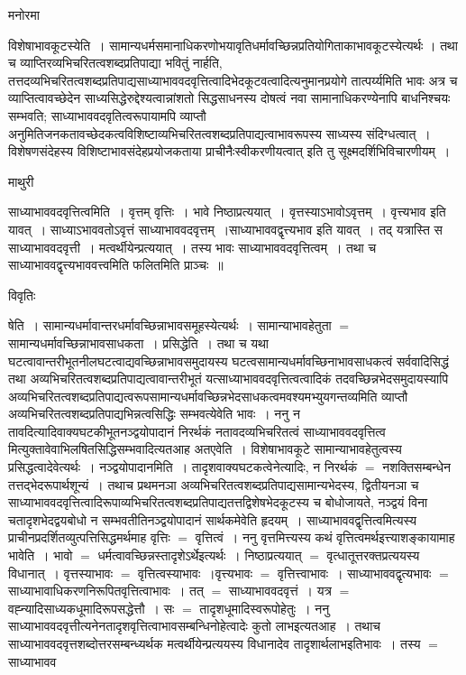 \documentclass[10pt, openany]{book}
\begin{document}
{\begin{center}   मनोरमा  \end{center}

विशेषाभावकूटस्येति~। सामान्यधर्मसमानाधिकरणोभयावृतिधर्मावच्छिन्नप्रतियोगिताकाभावकूटस्येत्यर्थः । तथा च व्याप्तिरव्यभिचरितत्वशब्दप्रतिपाद्या भवितुं नार्हति, तत्तदव्यभिचरितत्वशब्दप्रतिपाद्यसाध्याभाववदवृत्तित्वादिभेदकूटवत्वादित्यनुमानप्रयोगे तात्पर्य्यमिति भावः अत्र च व्याप्तित्वावच्छेदेन साध्यसिद्धेरुद्देश्यत्वान्नांशतो
सिद्धसाधनस्य दोषत्वं नवा सामानाधिकरण्येनापि बाधनिश्चयः सम्भवति; साध्याभाववदवृतित्वरूपायामपि व्याप्तौ अनुमितिजनकतावच्छेदकत्वविशिष्टाव्यभिचरितत्वशब्दप्रतिपाद्यत्वाभावरूपस्य साध्यस्य संदिग्धत्वात्~। विशेषणसंदेहस्य विशिष्टाभावसंदेहप्रयोजकताया प्राचीनैःस्वीकरणीयत्वात् इति तु सूक्ष्मदर्शिभिविचारणीयम्~।
\newpage
\begin{center}  माथुरी  \end{center}
{\la
साध्याभाववदवृत्तित्वमिति~। वृत्तम् वृत्तिः~। भावे निष्ठाप्रत्ययात्~। वृत्तस्याऽभावोऽवृत्तम्~। वृत्त्यभाव इति यावत्~। साध्याऽभाववतोऽवृत्तं साध्याभाववदवृत्तम्~।साध्याभाववद्वृत्त्यभाव इति यावत्~। तद् यत्रास्ति स साध्याभाववदवृत्ती~। मत्वर्थीयेन्प्रत्ययात्~। तस्य भावः साध्याभाववदवृत्तित्वम्~। तथा च साध्याभाववद्वृत्त्यभाववत्त्वमिति फलितमिति प्राञ्चः~॥}
\begin{center}     विवृतिः \end{center}
{\la षेति~।} सामान्यधर्मावान्तरधर्मावच्छिन्नाभावसमूहस्येत्यर्थः~। सामान्याभावहेतुता $=$ सामान्यधर्मावच्छिन्नाभावसाधकता~। {\la प्रसिद्धेति~।} तथा च यथा घटत्वावान्तरीभूतनीलघटत्वाद्यवच्छिन्नाभावसमुदायस्य घटत्वसामान्यधर्मावच्छिनाभावसाधकत्वं सर्ववादिसिद्धं तथा अव्यभिचरितत्वशब्दप्रतिपाद्यत्वावान्तरीभूतं यत्साध्याभाववदवृत्तित्वत्वादिकं तदवच्छिन्नभेदसमुदायस्यापि अव्यभिचरितत्वशब्दप्रतिपाद्यत्वरूपसामान्यधर्मावच्छिन्नभेदसाधकत्वमवश्यमभ्युयगन्तव्यमिति व्याप्तौ अव्यभिचरितत्वशब्दप्रतिपाद्यभिन्नत्वसिद्धिः सम्भवत्येवेति भावः~। ननु न तावदित्यादिवाक्यघटकीभूतनञ्द्वयोपादानं निरर्थकं नतावदव्यभिचरितत्वं साध्याभाववदवृत्तित्व मित्युक्तावेवाभिलषितसिद्धिसम्भवादित्यतआह अतएवेति~। विशेषाभावकूटे सामान्याभावहेतुत्वस्य प्रसिद्धत्वादेवेत्यर्थः~। नञ्द्वयोपादानमिति~। तादृशवाक्यघटकत्वेनेत्यादिः, न
निरर्थकं $=$ नशक्तिसम्बन्धेन  तत्तद्भेदरूपार्थशून्यं~। तथाच प्रथमनञा अव्यभिचरितत्वशब्दप्रतिपाद्यसामान्यभेदस्य, द्वितीयनञा च
साध्याभाववदवृत्तित्वादिरूपाव्यभिचरितत्वशब्दप्रतिपाद्यतत्तद्विशेषभेदकूटस्य च बोधोजायते, नञ्द्वयं विना चतादृशभेदद्वयबोधो न सम्भवतीतिनञ्द्वयोपादानं सार्थकमेवेति हृदयम्~। साध्याभाववद्वृत्तित्वमित्यस्य  प्राचीनप्रदर्शितव्युत्पत्तिसिद्धमर्थमाह  वृत्तिः $=$ वृत्तित्वं~। ननु वृत्तमित्त्यस्य कथं वृत्तित्वमर्थइत्त्याशङ्कायामाह भावेति~। भावो $=$ धर्मत्वावच्छिन्नस्तादृशेऽर्थेइत्यर्थः~। निष्ठाप्रत्ययात् $=$ वृत्धातूत्तरक्तप्रत्ययस्य विधानात्~। वृत्तस्याभावः $=$ वृत्तित्वस्याभावः~।वृत्त्यभावः $=$ वृत्तित्त्वाभावः~। साध्याभाववद्वृत्यभावः $=$ साध्याभावाधिकरणनिरूपितवृत्तित्वाभावः~। तत् $=$ साध्याभाववदवृत्तं~। यत्र $=$वह्न्यादिसाध्यकधूमादिरूपसद्धेत्तौ~। सः $=$ तादृशधूमादिस्वरूपोहेतुः~। ननु साध्याभाववदवृत्तीत्यनेनतादृशवृत्तित्वाभावसम्बन्धिनोहेत्वादेः कुतो लाभइत्यतआह~। तथाच साध्याभाववदवृत्तशब्दोत्तरसम्बन्ध्यर्थक मत्वर्थीयेन्प्रत्ययस्य विधानादेव तादृशार्थलाभइतिभावः~। तस्य $=$ साध्याभावव
}
\end{document}
